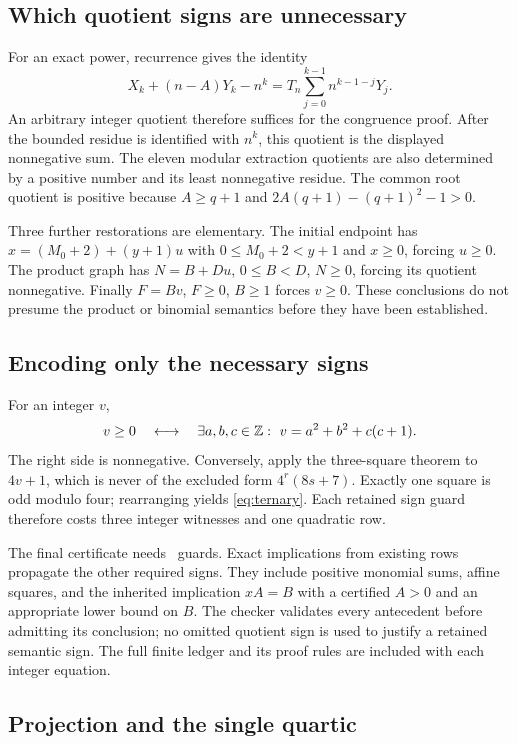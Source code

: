 \documentclass[10pt,letterpaper]{article}
\theoremstyle{remark}\newtheorem{remark}[theorem]{Remark}
\begin{document}
\subsection{Which quotient signs are unnecessary}

For an exact power, recurrence gives the identity
\[
 X_k+(n-A)Y_k-n^k
 =T_n\sum_{j=0}^{k-1}n^{k-1-j}Y_j.
\]
An arbitrary integer quotient therefore suffices for the congruence
proof. After the bounded residue is identified with $n^k$, this quotient
is the displayed nonnegative sum. The eleven modular extraction
quotients are also determined by a positive number and its least
nonnegative residue. The common root quotient is positive because
$A\ge q+1$ and $2A(q+1)-(q+1)^2-1>0$.

Three further restorations are elementary. The initial endpoint has
$x=(M_0+2)+(y+1)u$ with $0\le M_0+2<y+1$ and $x\ge0$, forcing $u\ge0$.
The product graph has $N=B+Du$, $0\le B<D$, $N\ge0$, forcing its
quotient nonnegative. Finally $F=Bv$, $F\ge0$, $B\ge1$ forces $v\ge0$.
These conclusions do not presume the product or binomial semantics
before they have been established.

\subsection{Encoding only the necessary signs}

For an integer $v$,
\begin{equation}\label{eq:ternary}
 v\ge0\quad\longleftrightarrow\quad
 \exists a,b,c\in\mathbb Z:\ v=a^2+b^2+c(c+1).
\end{equation}
The right side is nonnegative. Conversely, apply the three-square
theorem to $4v+1$, which is never of the excluded form $4^r(8s+7)$.
Exactly one square is odd modulo four; rearranging yields
\eqref{eq:ternary}. Each retained sign guard therefore costs three
integer witnesses and one quadratic row.

The final certificate needs \guardcount\ guards. Exact implications
from existing rows propagate the other required signs. They include
positive monomial sums, affine squares, and the inherited implication
$xA=B$ with a certified $A>0$ and an appropriate lower bound on $B$.
The checker validates every antecedent before admitting its conclusion;
no omitted quotient sign is used to justify a retained semantic sign.
The full finite ledger and its proof rules are included with each
integer equation.

\subsection{Projection and the single quartic}
\end{document}
